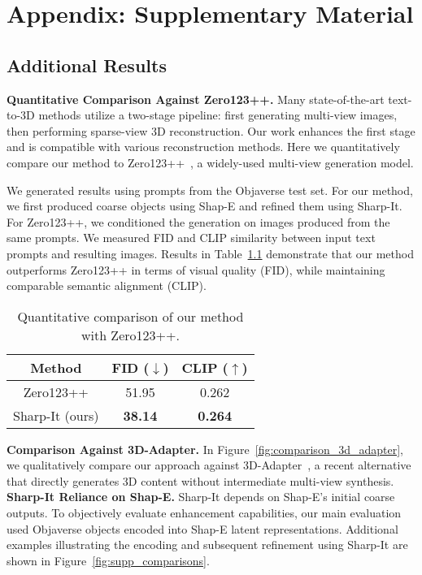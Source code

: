 \chapter{Appendix: Supplementary Material}
\label{appendix:supplementary}

\section{Additional Results}

\textbf{Quantitative Comparison Against Zero123++.} Many state-of-the-art text-to-3D methods utilize a two-stage pipeline: first generating multi-view images, then performing sparse-view 3D reconstruction. Our work enhances the first stage and is compatible with various reconstruction methods. Here we quantitatively compare our method to Zero123++~\cite{shi2023zero123singleimageconsistent}, a widely-used multi-view generation model.

We generated results using prompts from the Objaverse test set. For our method, we first produced coarse objects using Shap-E and refined them using Sharp-It. For Zero123++, we conditioned the generation on images produced from the same prompts. We measured FID and CLIP similarity between input text prompts and resulting images. Results in Table~\ref{tab:quant-zero123} demonstrate that our method outperforms Zero123++ in terms of visual quality (FID), while maintaining comparable semantic alignment (CLIP).

\begin{table}[h]
\centering
\caption{Quantitative comparison of our method with Zero123++.}
\begin{tabular}{c c c}
    \hline
    Method          & FID ($\downarrow$) & CLIP ($\uparrow$)  \\
    \hline
    Zero123++       & 51.95              & 0.262\\
    Sharp-It (ours) & \textbf{38.14}     & \textbf{0.264} \\
    \hline
\end{tabular}
\label{tab:quant-zero123}
\end{table}

\textbf{Comparison Against 3D-Adapter.} In Figure~\ref{fig:comparison_3d_adapter}, we qualitatively compare our approach against 3D-Adapter~\cite{3dadapter2024}, a recent alternative that directly generates 3D content without intermediate multi-view synthesis.
\textbf{Sharp-It Reliance on Shap-E.} Sharp-It depends on Shap-E's initial coarse outputs. To objectively evaluate enhancement capabilities, our main evaluation used Objaverse objects encoded into Shap-E latent representations. Additional examples illustrating the encoding and subsequent refinement using Sharp-It are shown in Figure~\ref{fig:supp_comparisons}.


